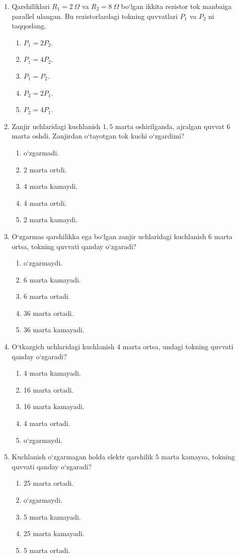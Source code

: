 \begin{enumerate}
\item Qarshiliklari $R_1=2~\Omega$ va $R_2=8~\Omega$ bo‘lgan ikkita rezistor tok manbaiga parallel ulangan. Bu rezistorlardagi tokning quvvatlari $P_1$ va $P_2$ ni taqqoslang.
\begin{enumerate}[label=\Alph*)]
\item $P_1=2P_2$.
\item $P_1=4P_2$.
\item $P_1=P_2$.
\item $P_2=2P_1$.
\item $P_2=4P_1$.
\end{enumerate}

\item Zanjir uchlaridagi kuchlanish $1,5$ marta oshirilganda, ajralgan quvvat $6$ marta oshdi. Zanjirdan o‘tayotgan tok kuchi o‘zgardimi?
\begin{enumerate}[label=\Alph*)]
\item o‘zgarmadi.
\item 2 marta ortdi.
\item 4 marta kamaydi.
\item 4 marta ortdi.
\item 2 marta kamaydi.
\end{enumerate}

\item O‘zgarmas qarshilikka ega bo‘lgan zanjir uchlaridagi kuchlanish $6$ marta ortsa, tokning quvvati qanday o‘zgaradi?
\begin{enumerate}[label=\Alph*)]
\item o‘zgarmaydi.
\item 6 marta kamayadi.
\item 6 marta ortadi.
\item 36 marta ortadi.
\item 36 marta kamayadi.
\end{enumerate}

\item O‘tkazgich uchlaridagi kuchlanish $4$ marta ortsa, undagi tokning quvvati qanday o‘zgaradi?
\begin{enumerate}[label=\Alph*)]
\item 4 marta kamayadi.
\item 16 marta ortadi.
\item 16 marta kamayadi.
\item 4 marta ortadi.
\item o‘zgarmaydi.
\end{enumerate}

\item Kuchlanish o‘zgarmagan holda elektr qarshilik $5$ marta kamaysa, tokning quvvati qanday o‘zgaradi?
\begin{enumerate}[label=\Alph*)]
\item 25 marta ortadi.
\item o‘zgarmaydi.
\item 5 marta kamayadi.
\item 25 marta kamayadi.
\item 5 marta ortadi.
\end{enumerate}


\end{enumerate}
